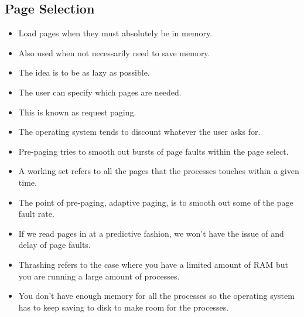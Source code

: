 \documentclass[]{article}
\begin{document}
\subsection{Page Selection}
\begin{itemize}
\item Load pages when they must absolutely be in memory.
\item Also used when not necessarily need to save memory.
\item The idea is to be as lazy as possible.
\item The user can specify which pages are needed.
\item This is known as request paging.
\item The operating system tends to discount whatever the user asks for.
\item Pre-paging tries to smooth out bursts of page faults within the page
select.
\item A working set refers to all the pages that the processes touches within a
given time.
\item The point of pre-paging, adaptive paging, is to smooth out some of the
page fault rate.
\item If we read pages in at a predictive fashion, we won't have the issue of
and delay of page faults.
\item Thrashing refers to the case where you have a limited amount of RAM but
you are running a large amount of processes.
\item You don't have enough memory for all the processes so the operating system
has to keep saving to disk to make room for the processes.
\end{itemize}
\end{document}
